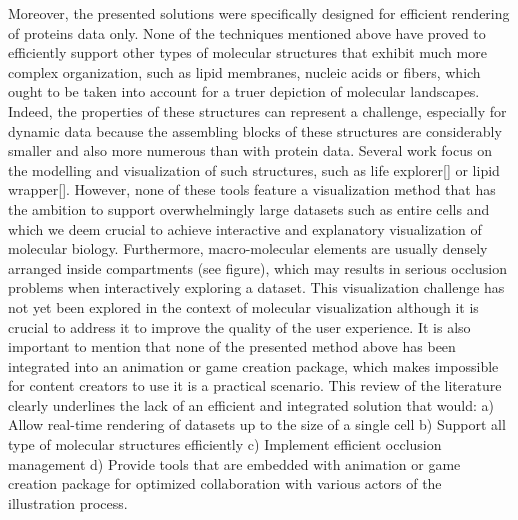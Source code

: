 Moreover, the presented solutions were specifically designed for efficient rendering of proteins data only.
None of the techniques mentioned above have proved to efficiently support other types of molecular structures that exhibit much more complex organization, such as lipid membranes, nucleic acids or fibers, which ought to be taken into account for a truer depiction of molecular landscapes.
Indeed, the properties of these structures can represent a challenge, especially for dynamic data because the assembling blocks of these structures are considerably smaller and also more numerous than with protein data.
Several work focus on the modelling and visualization of such structures, such as life explorer[] or lipid wrapper[].
However, none of these tools feature a visualization method that has the ambition to support overwhelmingly large datasets such as entire cells and which we deem crucial to achieve interactive and explanatory visualization of molecular biology.
Furthermore, macro-molecular elements are usually densely arranged inside compartments (see figure), which may results in serious occlusion problems when interactively exploring a dataset.
This visualization challenge has not yet been explored in the context of molecular visualization although it is crucial to address it to improve the quality of the user experience.
It is also important to mention that none of the presented method above has been integrated into an animation or game creation package, which makes impossible for content creators to use it is a practical scenario.
This review of the literature clearly underlines the lack of an efficient and integrated solution that would:
a) Allow real-time rendering of datasets up to the size of a single cell
b) Support all type of molecular structures efficiently
c) Implement efficient occlusion management
d) Provide tools that are embedded with animation or game creation package for optimized collaboration with various actors of the illustration process.

